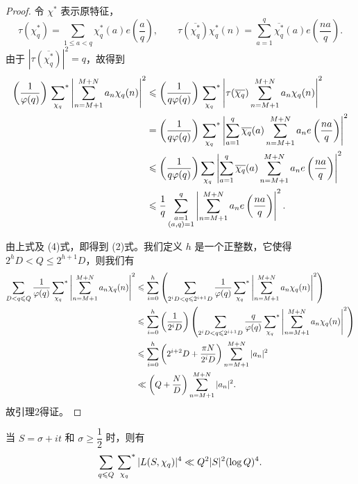 \begin{proof}
令 $\chi^*$ 表示原特征，
\[
\tau(\chi_q^*)=\sum_{1\leqslant a<q}\chi_q^*(a)e\left(\frac{a}{q}\right),
\qquad
\tau(\overline{\chi_q^*})\chi_q^*(n)
=\sum_{a=1}^{q}\overline{\chi_q^*}(a)e\left(\frac{na}{q}\right).
\]
由于 $|\tau(\overline{\chi_q^*})|^2=q$，故得到
\begin{align*}
\left(\frac{1}{\varphi(q)}\right)
\sideset{}{^*}\sum_{\chi_q}
\left|\sum_{n=M+1}^{M+N}a_n\chi_q(n)\right|^2
&\leqslant\left(\frac{1}{q\varphi(q)}\right)
\sideset{}{^*}\sum_{\chi_q}
\left|\tau(\overline{\chi_q})\sum_{n=M+1}^{M+N}a_n\chi_q(n)\right|^2\\
&=\left(\frac{1}{q\varphi(q)}\right)
\sideset{}{^*}\sum_{\chi_q}
\left|\sum_{a=1}^{q}\overline{\chi_q}(a)
\sum_{n=M+1}^{M+N}a_n e\left(\frac{na}{q}\right)\right|^2\\
&\leqslant\left(\frac{1}{q\varphi(q)}\right)
\sum_{\chi_q}
\left|\sum_{a=1}^{q}\overline{\chi_q}(a)
\sum_{n=M+1}^{M+N}a_n e\left(\frac{na}{q}\right)\right|^2\\
&\leqslant\frac{1}{q}\sum_{\substack{a=1\\(a,q)=1}}^{q}
\left|\sum_{n=M+1}^{M+N}a_n e\left(\frac{na}{q}\right)\right|^2.
\end{align*}

由上式及 (4)式，即得到 (2)式。我们定义 $h$ 是一个正整数，它使得 $2^hD<Q\leqslant2^{h+1}D$，则我们有
\begin{align*}
\sum_{D<q\leqslant Q}\frac{1}{\varphi(q)}
\sideset{}{^*}\sum_{\chi_q}
\left|\sum_{n=M+1}^{M+N}a_n\chi_q(n)\right|^2
&\leqslant\sum_{i=0}^{h}\left(
\sum_{2^iD<q\leqslant2^{i+1}D}\frac{1}{\varphi(q)}
\sideset{}{^*}\sum_{\chi_q}
\left|\sum_{n=M+1}^{M+N}a_n\chi_q(n)\right|^2\right)\\
&\leqslant\sum_{i=0}^{h}\left(\frac{1}{2^iD}\right)
\left(\sum_{2^iD<q\leqslant2^{i+1}D}\frac{q}{\varphi(q)}
\sideset{}{^*}\sum_{\chi_q}
\left|\sum_{n=M+1}^{M+N}a_n\chi_q(n)\right|^2\right)\\
&\leqslant\sum_{i=0}^{h}\left(2^{i+2}D+\frac{\pi N}{2^iD}\right)
\sum_{n=M+1}^{M+N}|a_n|^2\\
&\ll\left(Q+\frac{N}{D}\right)\sum_{n=M+1}^{M+N}|a_n|^2.
\end{align*}
故引理2得证。
\end{proof}

\begin{lemma}
当 $S=\sigma+it$ 和 $\sigma\geqslant\dfrac12$ 时，则有
\[
\sum_{q\leqslant Q}\sideset{}{^*}\sum_{\chi_q}|L(S,\chi_q)|^4
\ll Q^2|S|^2(\log Q)^4.
\]
\end{lemma}

